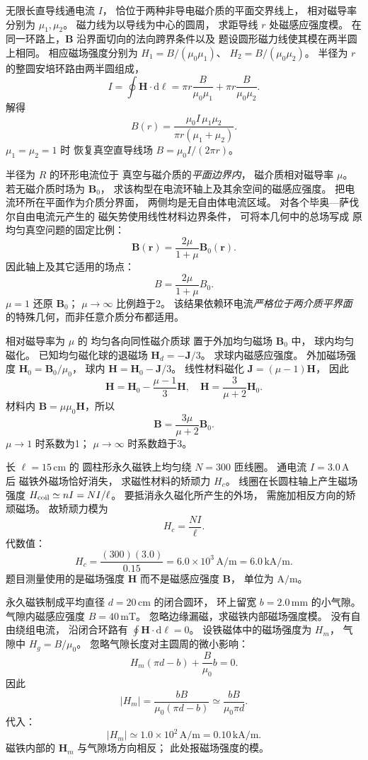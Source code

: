 无限长直导线通电流 $I$，
恰位于两种非导电磁介质的平面交界线上，
相对磁导率分别为 $\mu_1,\mu_2$。
磁力线为以导线为中心的圆周，
求距导线 $r$ 处磁感应强度模。
\exsolution
在同一环路上，$\bm B$
沿界面切向的法向跨界条件以及
题设圆形磁力线使其模在两半圆上相同。
相应磁场强度分别为
$H_1=B/(\mu_0\mu_1)$、
$H_2=B/(\mu_0\mu_2)$。
半径为 $r$ 的整圆安培环路由两半圆组成，
\[
I=\oint\bm H\cdot\mathrm d\bm\ell
=\pi r\frac B{\mu_0\mu_1}
+\pi r\frac B{\mu_0\mu_2}.
\]
解得
\[
\boxed{B(r)=\frac{\mu_0I\,\mu_1\mu_2}
{\pi r(\mu_1+\mu_2)}}.
\]
\excheck $\mu_1=\mu_2=1$ 时
恢复真空直导线场
$B=\mu_0I/(2\pi r)$。

半径为 $R$ 的环形电流位于
真空与磁介质的\emph{平面边界内}，
磁介质相对磁导率 $\mu$。
若无磁介质时场为 $\bm B_0$，
求该构型在电流环轴上及其余空间的磁感应强度。
\exsolution
把电流环所在平面作为介质分界面，
两侧均是无自由体电流区域。
对各个毕奥—萨伐尔自由电流元产生的
磁矢势使用线性材料边界条件，
可将本几何中的总场写成
原均匀真空问题的固定比例：
\[
\bm B(\bm r)=\frac{2\mu}{1+\mu}\bm B_0(\bm r).
\]
因此轴上及其它适用的场点：
\[
\boxed{B=\frac{2\mu}{1+\mu}B_0}.
\]
\excheck $\mu=1$ 还原 $\bm B_0$；
$\mu\to\infty$ 比例趋于2。
该结果依赖环电流\emph{严格位于两介质平界面}
的特殊几何，而非任意介质分布都适用。

相对磁导率为 $\mu$ 的
均匀各向同性磁介质球
置于外加均匀磁场 $\bm B_0$ 中，
球内均匀磁化。
已知均匀磁化球的退磁场
$\bm H_d=-\bm J/3$。
求球内磁感应强度。
\exsolution
外加磁场强度
$\bm H_0=\bm B_0/\mu_0$，
球内
$\bm H=\bm H_0-\bm J/3$。
线性材料磁化
$\bm J=(\mu-1)\bm H$，
因此
\[
\bm H=\bm H_0-\frac{\mu-1}{3}\bm H,
\quad
\bm H=\frac3{\mu+2}\bm H_0.
\]
材料内
$\bm B=\mu\mu_0\bm H$，所以
\[
\boxed{\bm B=
\frac{3\mu}{\mu+2}\bm B_0}.
\]
\excheck $\mu\to1$ 时系数为1；
$\mu\to\infty$ 时系数趋于3。

长 $\ell=15\,\mathrm{cm}$ 的
圆柱形永久磁铁上均匀绕
$N=300$ 匝线圈。
通电流 $I=3.0\,\mathrm A$ 后
磁铁外磁场恰好消失，
求磁性材料的矫顽力 $H_c$。
\exsolution
线圈在长圆柱轴上产生磁场强度
$H_{\rm coil}\simeq nI=NI/\ell$。
要抵消永久磁化所产生的外场，
需施加相反方向的矫顽磁场。
故矫顽力模为
\[
\boxed{H_c=\frac{NI}{\ell}}.
\]
代数值：
\[
\boxed{H_c=\frac{(300)(3.0)}{0.15}
=6.0\times10^3\,\mathrm{A/m}
=6.0\,\mathrm{kA/m}}.
\]
\excheck 题目测量使用的是磁场强度
$\bm H$ 而不是磁感应强度 $\bm B$，
单位为 $\mathrm{A/m}$。

永久磁铁制成平均直径
$d=20\,\mathrm{cm}$ 的闭合圆环，
环上留宽
$b=2.0\,\mathrm{mm}$ 的小气隙。
气隙内磁感应强度
$B=40\,\mathrm{mT}$。
忽略边缘漏磁，求磁铁内部磁场强度模。
\exsolution
没有自由绕组电流，
沿闭合环路有
$\oint\bm H\cdot\mathrm d\bm\ell=0$。
设铁磁体中的磁场强度为 $H_m$，
气隙中
$H_g=B/\mu_0$。
忽略气隙长度对主圆周的微小影响：
\[
H_m(\pi d-b)+\frac B{\mu_0}b=0.
\]
因此
\[
\boxed{|H_m|=
\frac{bB}{\mu_0(\pi d-b)}
\simeq\frac{bB}{\mu_0\pi d}}.
\]
代入：
\[
\boxed{|H_m|\simeq1.0\times10^2\,
\mathrm{A/m}=0.10\,\mathrm{kA/m}}.
\]
\excheck 磁铁内部的 $\bm H_m$
与气隙场方向相反；
此处报磁场强度的模。

